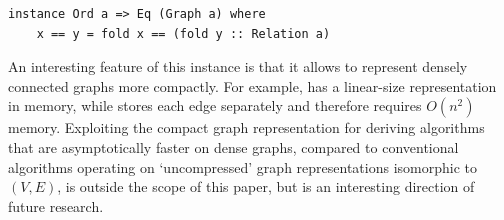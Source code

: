 \begin{verbatim}
instance Ord a => Eq (Graph a) where
    x == y = fold x == (fold y :: Relation a)
\end{verbatim}

An interesting feature of this instance is that it allows to represent
densely connected graphs more compactly. For example, 
has a linear-size representation in memory, while 
stores each edge separately and therefore requires $O(n^2)$ memory. Exploiting the
compact graph representation for deriving algorithms that are asymptotically faster
on dense graphs, compared to conventional algorithms operating on `uncompressed'
graph representations isomorphic to $(V,E)$, is outside the scope of this paper,
but is an interesting direction of future research.



